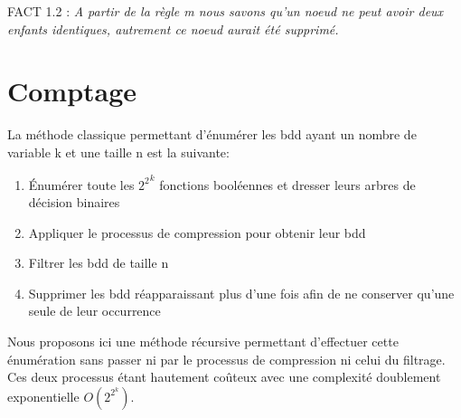 \documentclass[french]{article}
\begin{document}
FACT 1.2 : \emph{A partir de la règle m nous savons qu'un noeud ne peut avoir deux enfants identiques, autrement ce noeud aurait été supprimé.}

\section{Comptage}
La méthode classique permettant d'énumérer les bdd ayant un nombre de variable k et une taille n est la suivante:
\begin{enumerate}
    \item 
	Énumérer toute les \({2^2}^k\) fonctions booléennes et dresser leurs arbres de décision binaires
	\item
	Appliquer le processus de compression pour obtenir leur bdd
	\item
    Filtrer les bdd de taille n
	\item
	Supprimer les bdd réapparaissant plus d'une fois afin de ne conserver qu'une seule de leur occurrence
\end{enumerate}
Nous proposons ici une méthode récursive permettant d'effectuer cette énumération sans passer ni par le processus de compression ni celui du filtrage. Ces deux processus étant hautement coûteux avec une complexité doublement exponentielle \(O(2^{2^{k}})\).
\vspace{5mm} 
\end{document}

